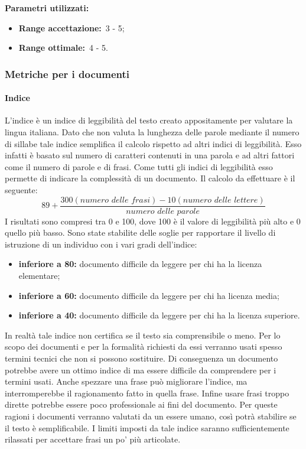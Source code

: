 				\textbf{Parametri utilizzati:}
				\begin{itemize}
					\item \textbf{Range accettazione:}\ 3 - 5;
					\item \textbf{Range ottimale:}\ 4 - 5.
				\end{itemize}
		\subsubsection{Metriche per i documenti}
			\label{sec:3.9.2}
			\paragraph{Indice }
				\label{sec:3.9.2.1}
				L'indice  è un indice di leggibilità del testo creato appositamente per valutare la lingua italiana. Dato che non valuta la lunghezza delle parole mediante il numero di sillabe tale indice semplifica il calcolo rispetto ad altri indici di leggibilità. Esso infatti è basato sul numero di caratteri contenuti in una parola e ad altri fattori come il numero di parole e di frasi. Come tutti gli indici di leggibilità esso permette di indicare la complessità di un documento. Il calcolo da effettuare è il seguente:
				\[89+\frac{300(numero\,\, delle\,\, frasi) - 10(numero\,\, delle\,\, lettere)}{numero\,\, delle\,\, parole}\]
				I risultati sono compresi tra 0 e 100, dove 100 è il valore di leggibilità più alto e 0 quello più basso. Sono state stabilite delle soglie per rapportare il livello di istruzione di un individuo con i vari gradi dell'indice:
				\begin{itemize}
					\item \textbf{inferiore a 80:} documento difficile da leggere per chi ha la licenza elementare;
					\item \textbf{inferiore a 60:} documento difficile da leggere per chi ha licenza media;
					\item \textbf{inferiore a 40:} documento difficile da leggere per chi ha la licenza superiore.
				\end{itemize}
				In realtà tale indice non certifica se il testo sia comprensibile o meno. Per lo scopo dei documenti e per la formalità richiesti da essi verranno usati spesso termini tecnici che non si possono sostituire. Di conseguenza un documento potrebbe avere un ottimo indice di  ma essere difficile da comprendere per i termini usati. Anche spezzare una frase può migliorare l'indice, ma interromperebbe il ragionamento fatto in quella frase. Infine usare frasi troppo dirette potrebbe essere poco professionale ai fini del documento. Per queste ragioni i documenti verranno valutati da un essere umano, così potrà stabilire se il testo è semplificabile. I limiti imposti da tale indice saranno sufficientemente rilassati per accettare frasi un po' più articolate.
				
